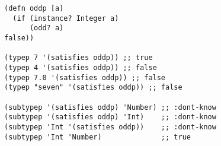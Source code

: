 \begin{lstlisting}[style=reclojureClojure]
(defn oddp [a]
  (if (instance? Integer a)
      (odd? a)
false))

(typep 7 '(satisfies oddp)) ;; true
(typep 4 '(satisfies oddp)) ;; false
(typep 7.0 '(satisfies oddp)) ;; false
(typep "seven" '(satisfies oddp)) ;; false

(subtypep '(satisfies oddp) 'Number) ;; :dont-know
(subtypep '(satisfies oddp) 'Int)    ;; :dont-know
(subtypep 'Int '(satisfies oddp))    ;; :dont-know
(subtypep 'Int 'Number)              ;; true
\end{lstlisting}
